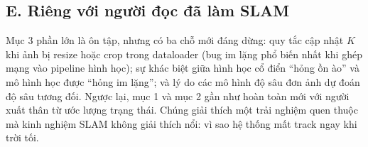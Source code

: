 \documentclass[../../deep_learning.tex]{subfiles}
\begin{document}
\subsection*{E. Riêng với người đọc đã làm SLAM}
Mục 3 phần lớn là ôn tập, nhưng có ba chỗ mới đáng dừng: quy tắc cập nhật \(K\) khi ảnh bị resize hoặc crop trong dataloader (bug im lặng phổ biến nhất khi ghép mạng vào pipeline hình học); sự khác biệt giữa hình học cổ điển ``hỏng ồn ào'' và mô hình học được ``hỏng im lặng''; và lý do các mô hình độ sâu đơn ảnh dự đoán độ sâu tương đối. Ngược lại, mục 1 và mục 2 gần như hoàn toàn mới với người xuất thân từ ước lượng trạng thái. Chúng giải thích một trải nghiệm quen thuộc mà kinh nghiệm SLAM không giải thích nổi: vì sao hệ thống mất track ngay khi trời tối.
\end{document}
